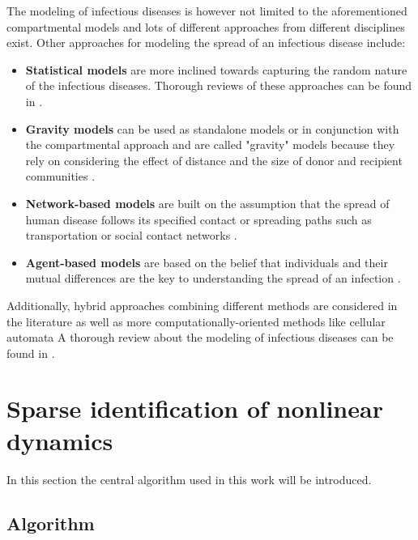 \documentclass[12pt, letterpaper]{article}
\begin{document}
The modeling of infectious diseases is however not limited to the aforementioned compartmental models and lots of different approaches from different disciplines exist. 
Other approaches for modeling the spread of an infectious disease include:

\begin{itemize}

\item \textbf{Statistical models} are more inclined towards capturing the random nature of the infectious diseases. 
Thorough reviews of these approaches can be found in \cite{statistical, statistical2}.

\item \textbf{Gravity models} can be used as standalone models or in conjunction with the compartmental approach and are called "gravity" models because they rely on considering the effect of distance and the size of donor and recipient communities \cite{gravity, gravity2}. 

\item \textbf{Network-based models} are built on the assumption that the spread of human disease follows its specified contact or spreading paths such as transportation or social contact networks \cite{network-based, network-based2}.

\item \textbf{Agent-based models} are based on the belief that individuals and their mutual differences are the key to understanding the spread of an infection \cite{agent-based, agent-based2}.
\end{itemize}

Additionally, hybrid approaches combining different methods are considered in the literature \cite{hybrid, hybrid2} as well as more computationally-oriented methods like cellular automata \cite{automata}
A thorough review about the modeling of infectious diseases can be found in \cite{epidemic-modeling-review}.

\section{Sparse identification of nonlinear dynamics}\label{sec:sindy}

In this section the central algorithm used in this work will be introduced. 

\subsection{Algorithm}
\end{document}
